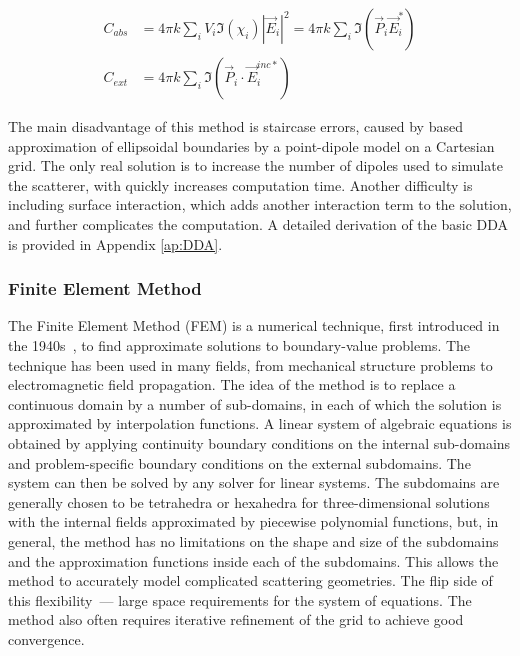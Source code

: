             \begin{align}
                C_{abs} &= 4\pi k \sum_i V_i \Im(\chi_i)|\vec{E}_i|^2 = 4\pi k \sum_i \Im(\vec{P}_i\vec{E}_i^*) \\
                C_{ext} &= 4\pi k \sum_i \Im (\vec{P}_i\cdot\vec{E}_i^{inc*})
            \end{align}

                The main disadvantage of this method is staircase errors, caused by based approximation of ellipsoidal boundaries by a point-dipole
            model on a Cartesian grid. The only real solution is to increase the number of dipoles used to simulate the scatterer, with quickly increases
            computation time. Another difficulty is including surface interaction, which adds another interaction term to the solution, and further
            complicates the computation. A detailed derivation of the basic DDA is provided in Appendix \ref{ap:DDA}.

        \subsubsection{Finite Element Method}
                The Finite Element Method (FEM) is a numerical technique, first introduced in the 1940s~\cite{courant1994variational}, to
            find approximate solutions to boundary-value problems. The technique has been used in many fields, from mechanical structure
            problems to electromagnetic field propagation.
                The idea of the method is to replace a continuous domain by a number of sub-domains, in each of which the solution is
            approximated by interpolation functions. A linear system of algebraic equations is obtained by applying continuity boundary conditions
            on the internal sub-domains and problem-specific boundary conditions on the external subdomains. The system can then be solved
            by any solver for linear systems. The subdomains are generally chosen to be tetrahedra or hexahedra for three-dimensional solutions
            with the internal fields approximated by piecewise polynomial functions, but, in general, the method has no limitations on the
            shape and size of the subdomains and the approximation functions inside each of the subdomains. This allows the method
            to accurately model complicated scattering geometries. The flip side of this flexibility~--- large space requirements for
            the system of equations. The method also often requires iterative refinement of the grid to achieve good convergence.

